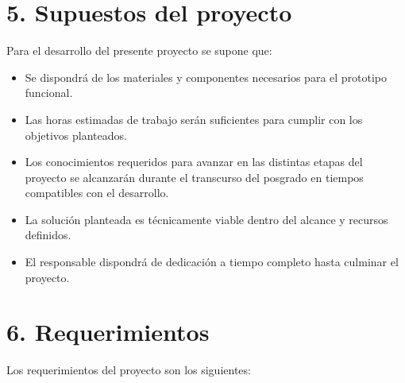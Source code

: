 \documentclass[
11pt, %
]{charter}
\begin{document}
\section{5. Supuestos del proyecto}
\label{sec:supuestos}

Para el desarrollo del presente proyecto se supone que: 

\begin{itemize}
	\item Se dispondrá de los materiales y componentes necesarios para el prototipo funcional.
	\item Las horas estimadas de trabajo serán suficientes para cumplir con los objetivos planteados.
	\item Los conocimientos requeridos para avanzar en las distintas etapas del proyecto se alcanzarán durante el transcurso del posgrado en tiempos compatibles con el desarrollo.
	\item La solución planteada es técnicamente viable dentro del alcance y recursos definidos.
	\item El responsable dispondrá de dedicación a tiempo completo hasta culminar el proyecto.
\end{itemize}


\section{6. Requerimientos}
\label{sec:requerimientos}

Los requerimientos del proyecto son los siguientes:
\end{document}
